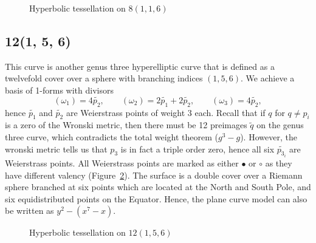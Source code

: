 \documentclass[12pt,reqno]{amsart}
\theoremstyle{definition}
\theoremstyle{remark}
\begin{document}
\begin{figure}[htbp]
    \centering
    \caption{Hyperbolic tessellation on $8(1, 1, 6)$}%
    \label{fig:116}%
\end{figure}




\subsection*{12(1, 5, 6)}
This curve is another genus three hyperelliptic curve that is defined as a twelvefold cover over a sphere with branching indices $(1, 5, 6).$ We achieve a basis of 1-forms with divisors $$(\omega_1) = 4 \widetilde{p_2}, \qquad (\omega_2) = 2 \widetilde{p_1} + 2 \widetilde{p_2}, \qquad (\omega_3) = 4 \widetilde{p_2},$$ hence $\widetilde{p_1}$ and $\widetilde{p_2}$ are Weierstrass points of weight 3 each. Recall that if $q$ for $q \neq p_i$ is a zero of the Wronski metric, then there must be 12 preimages $\widetilde{q}$ on the genus three curve, which contradicts the total weight theorem ($g^3 - g$). However, the wronski metric tells us that $p_3$ is in fact a triple order zero, hence all six $\widetilde{p_{3_i}}$ are Weierstrass points. All Weierstrass points are marked as either $\bullet$ or $\circ$ as they have different valency (Figure~\ref{fig:156}). The surface is a double cover over a Riemann sphere branched at six points which are located at the North and South Pole, and six equidistributed points on the Equator. Hence, the plane curve model can also be written as $y^2 - (x^7 - x).$

\begin{figure}[htbp]
    \centering
    \caption{Hyperbolic tessellation on $12(1, 5, 6)$}%
    \label{fig:156}%
\end{figure}
\end{document}

